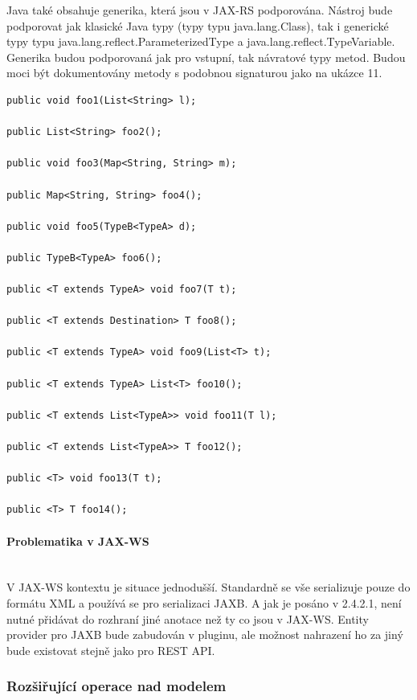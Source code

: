 \documentclass[11pt,twoside,a4paper]{book}
\begin{document}
Java také obsahuje generika, která jsou v JAX-RS podporována. Nástroj bude podporovat jak
klasické Java typy (typy typu java.lang.Class), tak i generické typy typu
java.lang.reflect.ParameterizedType a java.lang.reflect.TypeVariable. Generika
budou podporovaná jak pro vstupní, tak návratové typy metod. Budou moci být 
dokumentovány metody s podobnou signaturou jako na ukázce 11.

\begin{lstlisting}[frame=single, caption={Příklad podporovaných signatur
resource metod}, label={lst:signatury-metod}]
public void foo1(List<String> l);

public List<String> foo2();

public void foo3(Map<String, String> m);

public Map<String, String> foo4();

public void foo5(TypeB<TypeA> d);

public TypeB<TypeA> foo6();

public <T extends TypeA> void foo7(T t);

public <T extends Destination> T foo8();

public <T extends TypeA> void foo9(List<T> t);

public <T extends TypeA> List<T> foo10();

public <T extends List<TypeA>> void foo11(T l);

public <T extends List<TypeA>> T foo12();

public <T> void foo13(T t);

public <T> T foo14();
\end{lstlisting}

\paragraph{Problematika v JAX-WS}
\mbox{}\\

V JAX-WS kontextu je situace jednodušší. Standardně se vše serializuje pouze do formátu
XML a používá se pro serializaci JAXB. A jak je posáno v 2.4.2.1, není nutné přidávat do
rozhraní jiné anotace než ty co jsou v JAX-WS. Entity provider pro JAXB bude zabudován v
pluginu, ale možnost nahrazení ho za jiný bude existovat stejně jako pro REST API.

\subsubsection{Rozšiřující operace nad modelem}
\end{document}
